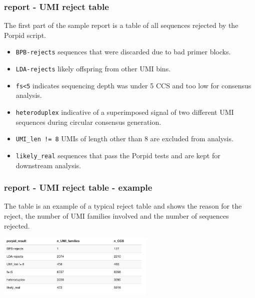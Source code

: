 \documentclass{beamer}
\begin{document}
\begin{frame}[fragile]
\frametitle{report - UMI reject table}

\alert<1> 

The first part of the sample report is a table of all sequences rejected by the Porpid script.

\bigskip
\begin{itemize}
\item[] {\color{blue} {\tt BPB-rejects}} 
              sequences that were discarded due to bad primer blocks.
\item[] {\color{blue} {\tt LDA-rejects}} 
              likely offspring from other UMI bins.
\item[] {\color{blue} {\tt fs<5}} 
              indicates sequencing depth was under 5 CCS and too low for consensus analysis. 
\item[] {\color{blue} {\tt heteroduplex}} 
               indicative of a superimposed signal of two different UMI sequences during circular consensus generation. 
\item[]  {\color{blue} {\tt UMI\_len != 8}} 
               UMIs of length other than 8 are excluded from analysis.
\end{itemize}

\begin{itemize}
\item[] {\color{blue} {\tt likely\_real}} 
             sequences that pass the Porpid tests and are kept for downstream analysis.
\end{itemize}

\end{frame}

\begin{frame}[fragile]
\frametitle{report - UMI reject table - example}

\alert<1> 

The table is an example of a typical reject table and shows the reason for the reject, the number of UMI families involved 
and the number of sequences rejected.

\bigskip
\begin{center}
\includegraphics[height=3cm]{images/reject_table.png} 
\end{center}

\end{frame}
\end{document}
